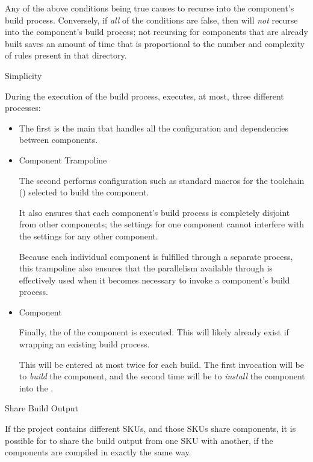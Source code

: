 \begin{description}
  Any of the above conditions being true causes \lmsbw to recurse into
  the component's build process.  Conversely, if \emph{all} of the
  conditions are false, then \lmsbw will \emph{not} recurse into the
  component's build process; not recursing for components that are
  already built saves an amount of time that is proportional to the
  number and complexity of \make rules present in that directory.

\item{\makefile Simplicity}

  During the execution of the build process, \lmsbw executes, at most,
  three different \makefile processes:

  \begin{itemize}
  \item{\lmsbw \makefile}

    The first is the main \lmsbw \makefile tbat handles all the
    configuration and dependencies between components.

  \item{Component Trampoline \makefile}

    The second \makefile performs configuration such as standard
    macros for the toolchain ()
    selected to build the component.

    It also ensures that each component's build process is completely
    disjoint from other components; the settings for one component
    cannot interfere with the settings for any other component.

    Because each individual component is fulfilled through a separate
    \make process, this trampoline also ensures that the parallelism
    available through \gnumake is effectively used when it becomes
    necessary to invoke a component's build process.

  \item{Component \makefile}

    Finally, the \makefile of the component is executed.  This will
    likely already exist if wrapping an existing build process.

    This \makefile will be entered at most twice for each build.  The
    first invocation will be to \emph{build} the component, and the
    second time will be to \emph{install} the component into the
    \destdir.
\end{itemize}

\item{Share Build Output}

  If the project contains different SKUs, and those SKUs share
  components, it is possible for \lmsbw to share the build output from
  one SKU with another, if the components are compiled in exactly the
  same way.

\end{description}

